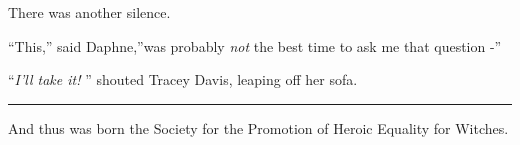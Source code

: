 There was another silence.

``This,'' said Daphne,''was probably \emph{not} the best time to ask me
that question -''

``\emph{I'll take it!} '' shouted Tracey Davis, leaping off her sofa.

\begin{center}\rule{3in}{0.4pt}\end{center}

And thus was born the Society for the Promotion of Heroic Equality for
Witches.
